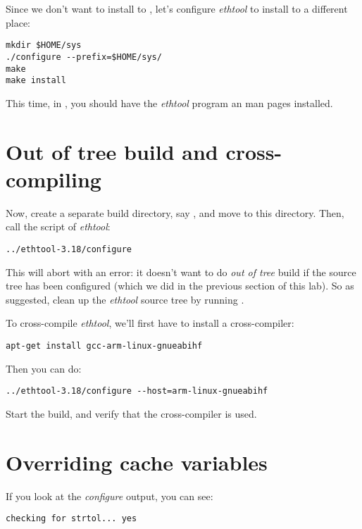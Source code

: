 Since we don't want to install to , let's configure
{\em ethtool} to install to a different place:

\begin{verbatim}
mkdir $HOME/sys
./configure --prefix=$HOME/sys/
make
make install
\end{verbatim}

This time, in , you should have the {\em ethtool}
program an man pages installed.

\section{Out of tree build and cross-compiling}

Now, create a separate build directory, say ,
and move to this directory. Then, call the  script of
{\em ethtool}:

\begin{verbatim}
../ethtool-3.18/configure
\end{verbatim}

This will abort with an error: it doesn't want to do {\em out of tree}
build if the source tree has been configured (which we did in the
previous section of this lab). So as suggested, clean up the {\em
  ethtool} source tree by running .

To cross-compile {\em ethtool}, we'll first have to install a
cross-compiler:

\begin{verbatim}
apt-get install gcc-arm-linux-gnueabihf
\end{verbatim}

Then you can do:

\begin{verbatim}
../ethtool-3.18/configure --host=arm-linux-gnueabihf
\end{verbatim}

Start the build, and verify that the cross-compiler is used.

\section{Overriding cache variables}

If you look at the {\em configure} output, you can see:

\begin{verbatim}
checking for strtol... yes
\end{verbatim}

